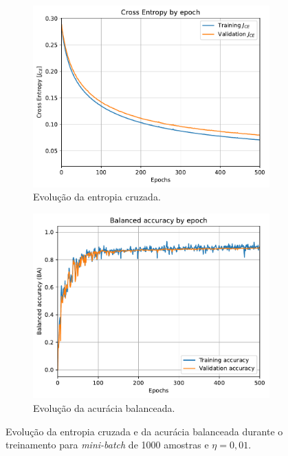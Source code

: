 \begin{figure}[H]
	\begin{subfigure}[H]{0.49\textwidth}
		\centering
		\includegraphics[width = \linewidth]{../../plot/LR_1/CE_500_epochs_batch_size1000}
		\caption{Evolução da entropia cruzada.}
		\label{fig:CE_500_epochs_batch_size1000}
	\end{subfigure}
	\begin{subfigure}[H]{0.49\textwidth}
		\centering
		\includegraphics[width = \linewidth]{../../plot/LR_1/BA_500_epochs_batch_size1000}
		\caption{Evolução da acurácia balanceada.}
		\label{fig:BA_500_epochs_batch_size1000}
	\end{subfigure}
	\caption{Evolução da entropia cruzada e da acurácia balanceada durante o treinamento para \textit{mini-batch} de 1000 amostras e $\eta = 0,01$.}
\end{figure}

